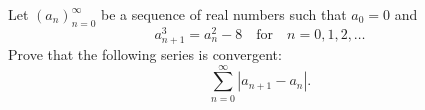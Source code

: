 Let \((a_n)_{n=0}^{\infty}\) be a sequence of real numbers such that \(a_0=0\) and
\[a_{n+1}^3=a_n^2-8\quad \text{for} \quad n=0,1,2,\ldots\]Prove that the following series is convergent:
\[\sum_{n=0}^{\infty}{|a_{n+1}-a_n|}.\]
